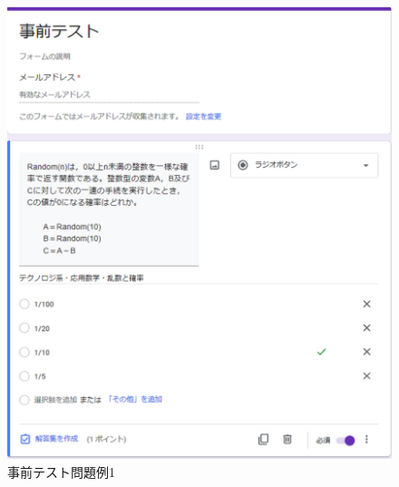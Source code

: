 \begin{figure}[htbp]
\begin{center}
\includegraphics[width=13cm]{img/jizen1.eps}
\end{center}
\caption{事前テスト問題例1}
\label{fig:jizen1}
\end{figure}

